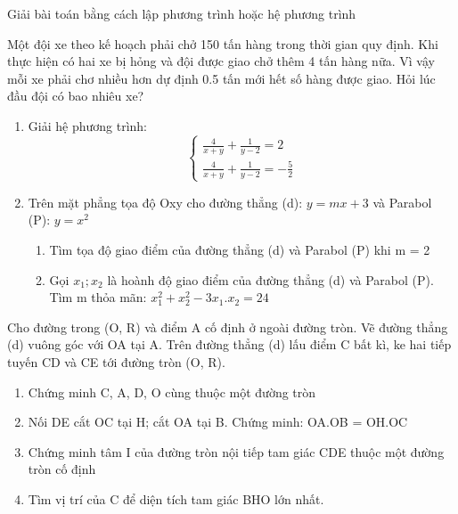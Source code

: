\begin{ex}
Giải bài toán bằng cách lập phương trình hoặc hệ phương trình

Một đội xe theo kế hoạch phải chở 150 tấn hàng trong thời gian quy định. Khi thực hiện có hai xe bị hỏng  và đội được giao chở thêm 4 tấn hàng nữa. Vì vậy mỗi xe phải chơ nhiều hơn dự định 0.5 tấn mới hết số hàng được giao. Hỏi lúc đầu đội có bao nhiêu xe?
\end{ex}

\begin{ex}
\begin{enumerate}
\item Giải hệ phương trình:\\ 
$$ 
\displaystyle\left\{ {\begin{array}{*{20}{c}}
  {\displaystyle\frac{4}{{x + y}} + \frac{1}{{y - 2}} = 2} \\ 
  {\displaystyle\frac{4}{{x + y}} + \frac{1}{{y - 2}} =  - \frac{5}{2}} 
\end{array}} \right. $$
\item Trên mặt phẳng tọa độ Oxy cho đường thẳng (d): $y = mx + 3$ và Parabol (P): $y = x^{2}$
\begin{enumerate}[1.]
\item Tìm tọa độ giao điểm của đường thẳng (d) và Parabol (P) khi m = 2
\item  Gọi $ x_{1};x_{2}$ là hoành độ giao điểm của đường thẳng (d) và Parabol (P). Tìm m thỏa mãn: $  x^{2}_{1} + x^{2}_{2} - 3x_{1}.x_{2} = 24$
\end{enumerate}
\end{enumerate}
\end{ex}

\begin{ex}
Cho đường trong (O, R) và điểm A cố định ở ngoài đường tròn. Vẽ đường thẳng (d) vuông góc với OA tại A. Trên đường thẳng (d) lấu điểm C bất kì, ke hai tiếp tuyến CD và CE tới đường tròn  (O, R).
\begin{enumerate}
\item Chứng minh C, A, D, O cùng thuộc một đường tròn
\item Nối DE cắt OC tại H; cắt OA tại B. Chứng minh: OA.OB = OH.OC
\item Chứng minh tâm I của đường tròn nội tiếp tam giác CDE thuộc một đường tròn cố định
\item Tìm vị trí của C để diện tích tam giác BHO lớn  nhất.
\end{enumerate}
\end{ex}


